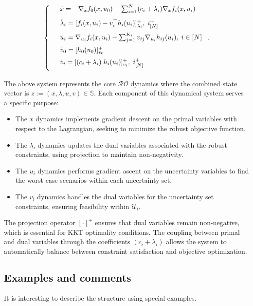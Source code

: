 \documentclass[journal,twoside,web]{ieeecolor}
\newcommand{\rev}[1]{\textcolor{revisionblue}{#1}}
\begin{document}
\begin{align} \label{pd_dynamics}
\left\{
\begin{array}{cl}
\vspace{3mm}
&\dot x=-\nabla_x f_0(x,u_0)-  \sum_{i=1}^N(c_i+\lambda_i) \nabla_x f_i(x,u_i)\\
\vspace{2mm}
&\dot \lambda_i=[f_i(x,u_i)-v_i^\top h_i(u_i)]_{\lambda_i}^+,\; i^+_{[N]}\\
\vspace{2mm}
&\dot u_i=\nabla_{u_i}f_i(x,u_i)-  \sum_{j=1}^{K_i} v_{ij} \nabla_{u_i} h_{ij}(u_i),\; i\in[N]\\
\vspace{2mm}
&\dot{v}_0=[h_0(u_0)]_{v_0}^+\\
\vspace{2mm}
&\dot v_i=[(c_i+\lambda_i) \; h_i(u_i)]_{v_i}^+,\;i^+_{[N]}
\end{array}\right..
\end{align}

\rev{The above system represents the core $\mathcal{RO}$ dynamics where the combined state vector is $z:=(x,\lambda,u,v) \in \mathbb{S}$. Each component of this dynamical system serves a specific purpose:

\begin{itemize}
\item The $x$ dynamics implements gradient descent on the primal variables with respect to the Lagrangian, seeking to minimize the robust objective function.
\item The $\lambda_i$ dynamics updates the dual variables associated with the robust constraints, using projection to maintain non-negativity.
\item The $u_i$ dynamics performs gradient ascent on the uncertainty variables to find the worst-case scenarios within each uncertainty set.
\item The $v_i$ dynamics handles the dual variables for the uncertainty set constraints, ensuring feasibility within $\mathcal{U}_i$.
\end{itemize}

The projection operator $[\cdot]^+$ ensures that dual variables remain non-negative, which is essential for KKT optimality conditions. The coupling between primal and dual variables through the coefficients $(c_i+\lambda_i)$ allows the system to automatically balance between constraint satisfaction and objective optimization.}

\subsection{Examples and comments} \label{examples_and_comments}
It is interesting to describe the structure using special examples.
\end{document}
